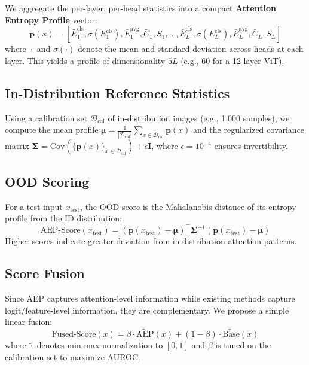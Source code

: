\documentclass{article}
\newcommand{\AEP}{\textsc{AEP}}
\begin{document}
We aggregate the per-layer, per-head statistics into a compact \textbf{Attention Entropy Profile} vector:
\begin{equation}
\mathbf{p}(x) = \left[\bar{E}^{\text{cls}}_1, \sigma(E^{\text{cls}}_1), \bar{E}^{\text{avg}}_1, \bar{C}_1, S_1, \ldots, \bar{E}^{\text{cls}}_L, \sigma(E^{\text{cls}}_L), \bar{E}^{\text{avg}}_L, \bar{C}_L, S_L\right]
\label{eq:profile}
\end{equation}
where $\bar{\cdot}$ and $\sigma(\cdot)$ denote the mean and standard deviation across heads at each layer. This yields a profile of dimensionality $5L$ (e.g., 60 for a 12-layer ViT).

\subsection{In-Distribution Reference Statistics}

Using a calibration set $\mathcal{D}_{\text{cal}}$ of in-distribution images (e.g., 1,000 samples), we compute the mean profile $\boldsymbol{\mu} = \frac{1}{|\mathcal{D}_{\text{cal}}|}\sum_{x \in \mathcal{D}_{\text{cal}}} \mathbf{p}(x)$ and the regularized covariance matrix $\boldsymbol{\Sigma} = \text{Cov}(\{\mathbf{p}(x)\}_{x \in \mathcal{D}_{\text{cal}}}) + \epsilon \mathbf{I}$, where $\epsilon = 10^{-4}$ ensures invertibility.

\subsection{OOD Scoring}

For a test input $x_{\text{test}}$, the OOD score is the Mahalanobis distance of its entropy profile from the ID distribution:
\begin{equation}
\text{AEP-Score}(x_{\text{test}}) = (\mathbf{p}(x_{\text{test}}) - \boldsymbol{\mu})^\top \boldsymbol{\Sigma}^{-1} (\mathbf{p}(x_{\text{test}}) - \boldsymbol{\mu})
\label{eq:score}
\end{equation}
Higher scores indicate greater deviation from in-distribution attention patterns.

\subsection{Score Fusion}

Since \AEP{} captures attention-level information while existing methods capture logit/feature-level information, they are complementary. We propose a simple linear fusion:
\begin{equation}
\text{Fused-Score}(x) = \beta \cdot \widetilde{\text{AEP}}(x) + (1-\beta) \cdot \widetilde{\text{Base}}(x)
\label{eq:fusion}
\end{equation}
where $\widetilde{\cdot}$ denotes min-max normalization to $[0,1]$ and $\beta$ is tuned on the calibration set to maximize AUROC.
\end{document}
